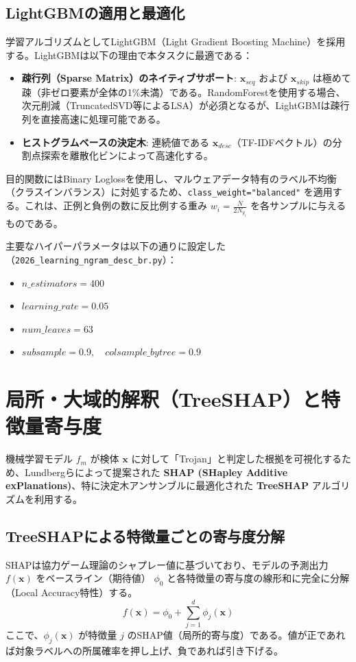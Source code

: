 \documentclass[11pt,a4paper,dvipdfmx]{article}
\begin{document}
\subsection{LightGBMの適用と最適化}
学習アルゴリズムとしてLightGBM（Light Gradient Boosting Machine）を採用する。LightGBMは以下の理由で本タスクに最適である：
\begin{itemize}
    \item \textbf{疎行列（Sparse Matrix）のネイティブサポート}: $\mathbf{x}_{seq}$ および $\mathbf{x}_{skip}$ は極めて疎（非ゼロ要素が全体の1\%未満）である。RandomForestを使用する場合、次元削減（TruncatedSVD等によるLSA）が必須となるが、LightGBMは疎行列を直接高速に処理可能である。
    \item \textbf{ヒストグラムベースの決定木}: 連続値である $\mathbf{x}_{desc}$（TF-IDFベクトル）の分割点探索を離散化ビンによって高速化する。
\end{itemize}

目的関数にはBinary Loglossを使用し、マルウェアデータ特有のラベル不均衡（クラスインバランス）に対処するため、\texttt{class\_weight="balanced"} を適用する。これは、正例と負例の数に反比例する重み $w_i = \frac{N}{2 N_{y_i}}$ を各サンプルに与えるものである。

主要なハイパーパラメータは以下の通りに設定した（\texttt{2026\_learning\_ngram\_desc\_br.py}）：
\begin{itemize}
    \item $n\_estimators = 400$
    \item $learning\_rate = 0.05$
    \item $num\_leaves = 63$
    \item $subsample = 0.9, \quad colsample\_bytree = 0.9$
\end{itemize}

\section{局所・大域的解釈（TreeSHAP）と特徴量寄与度}

機械学習モデル $f_m$ が検体 $\mathbf{x}$ に対して「Trojan」と判定した根拠を可視化するため、Lundbergらによって提案された \textbf{SHAP (SHapley Additive exPlanations)}、特に決定木アンサンブルに最適化された \textbf{TreeSHAP} アルゴリズムを利用する。

\subsection{TreeSHAPによる特徴量ごとの寄与度分解}
SHAPは協力ゲーム理論のシャプレー値に基づいており、モデルの予測出力 $f(\mathbf{x})$ をベースライン（期待値） $\phi_0$ と各特徴量の寄与度の線形和に完全に分解（Local Accuracy特性）する。
\begin{equation}
    f(\mathbf{x}) = \phi_0 + \sum_{j=1}^{d} \phi_j(\mathbf{x})
\end{equation}
ここで、$\phi_j(\mathbf{x})$ が特徴量 $j$ のSHAP値（局所的寄与度）である。値が正であれば対象ラベルへの所属確率を押し上げ、負であれば引き下げる。
\end{document}

